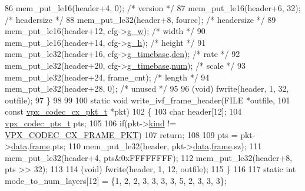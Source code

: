 \begin{DoxyCodeInclude}
{{86     mem\_put\_le16(header+4,  0);                   \textcolor{comment}{/* version */}
87     mem\_put\_le16(header+6,  32);                  \textcolor{comment}{/* headersize */}
88     mem\_put\_le32(header+8,  fourcc);              \textcolor{comment}{/* headersize */}
89     mem\_put\_le16(header+12, cfg->\hyperlink{structvpx__codec__enc__cfg_a5c165f5b41ca1158f2883983a2b7709c}{g\_w});            \textcolor{comment}{/* width */}
90     mem\_put\_le16(header+14, cfg->\hyperlink{structvpx__codec__enc__cfg_a4132bd89ce85bce7c08f2cc3b6f2b82e}{g\_h});            \textcolor{comment}{/* height */}
91     mem\_put\_le32(header+16, cfg->\hyperlink{structvpx__codec__enc__cfg_a6498d378e4c29ef3e22258289e481087}{g\_timebase}.\hyperlink{structvpx__rational_a29dd2ab4001377b3aa21885ef969759f}{den}); \textcolor{comment}{/* rate */}
92     mem\_put\_le32(header+20, cfg->\hyperlink{structvpx__codec__enc__cfg_a6498d378e4c29ef3e22258289e481087}{g\_timebase}.\hyperlink{structvpx__rational_ae7774f21a22c9bef3aa73156c79f4731}{num}); \textcolor{comment}{/* scale */}
93     mem\_put\_le32(header+24, frame\_cnt);           \textcolor{comment}{/* length */}
94     mem\_put\_le32(header+28, 0);                   \textcolor{comment}{/* unused */}
95 
96     (void) fwrite(header, 1, 32, outfile);
97 \}
98 
99 
100 \textcolor{keyword}{static} \textcolor{keywordtype}{void} write\_ivf\_frame\_header(FILE *outfile,
101                                    \textcolor{keyword}{const} \hyperlink{structvpx__codec__cx__pkt}{vpx\_codec\_cx\_pkt\_t} *pkt)
102 \{
103     \textcolor{keywordtype}{char}             header[12];
104     \hyperlink{group__encoder_ga7e711b0a71c65aef8f0faea8bd57b05f}{vpx\_codec\_pts\_t}  pts;
105 
106     \textcolor{keywordflow}{if}(pkt->\hyperlink{structvpx__codec__cx__pkt_a41f395b39516343c1329a4a85a0084f2}{kind} != \hyperlink{group__encoder_gga28a79375279536526552af3a83d2ed72a2261aae5594289400e812fb1e6b6b0cc}{VPX\_CODEC\_CX\_FRAME\_PKT})
107         \textcolor{keywordflow}{return};
108 
109     pts = pkt->\hyperlink{structvpx__codec__cx__pkt_a7f97b060a23b7e89fe5b885c0074f696}{data}.\hyperlink{structvpx__codec__cx__pkt_a81e33bf4408a3983abb16492fee359ff}{frame}.pts;
110     mem\_put\_le32(header, pkt->\hyperlink{structvpx__codec__cx__pkt_a7f97b060a23b7e89fe5b885c0074f696}{data}.\hyperlink{structvpx__codec__cx__pkt_a81e33bf4408a3983abb16492fee359ff}{frame}.sz);
111     mem\_put\_le32(header+4, pts&0xFFFFFFFF);
112     mem\_put\_le32(header+8, pts >> 32);
113 
114     (void) fwrite(header, 1, 12, outfile);
115 \}
116 
117 \textcolor{keyword}{static} \textcolor{keywordtype}{int} mode\_to\_num\_layers[12] = \{1, 2, 2, 3, 3, 3, 3, 5, 2, 3, 3, 3\};
}}
\end{DoxyCodeInclude}
